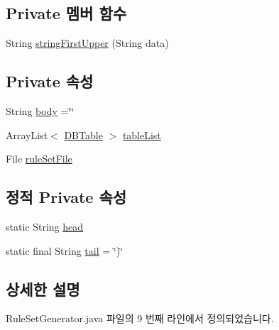 \subsection*{Private 멤버 함수}
\begin{DoxyCompactItemize}
\item 
String \mbox{\hyperlink{classcom_1_1github_1_1aites_1_1framework_1_1ruleset_1_1_rule_set_generator_a03d399d47d0d6aa6ffbb7c3ce7523fee}{string\+First\+Upper}} (String data)
\end{DoxyCompactItemize}
\subsection*{Private 속성}
\begin{DoxyCompactItemize}
\item 
String \mbox{\hyperlink{classcom_1_1github_1_1aites_1_1framework_1_1ruleset_1_1_rule_set_generator_a1fbfa36b17c118b50f731278af7d8ae5}{body}} =\char`\"{}\char`\"{}
\item 
Array\+List$<$ \mbox{\hyperlink{classcom_1_1github_1_1aites_1_1framework_1_1dbcomponent_1_1_d_b_table}{D\+B\+Table}} $>$ \mbox{\hyperlink{classcom_1_1github_1_1aites_1_1framework_1_1ruleset_1_1_rule_set_generator_ac7d8dddafc874c8c1d0bdedfec634d6d}{table\+List}}
\item 
File \mbox{\hyperlink{classcom_1_1github_1_1aites_1_1framework_1_1ruleset_1_1_rule_set_generator_a4a4bf29943c7c05a7e1a7d60040305ff}{rule\+Set\+File}}
\end{DoxyCompactItemize}
\subsection*{정적 Private 속성}
\begin{DoxyCompactItemize}
\item 
static String \mbox{\hyperlink{classcom_1_1github_1_1aites_1_1framework_1_1ruleset_1_1_rule_set_generator_a571e3c391cc48fdfdd9cc286988317fe}{head}}
\item 
static final String \mbox{\hyperlink{classcom_1_1github_1_1aites_1_1framework_1_1ruleset_1_1_rule_set_generator_a2bd41e50cccfad575989d06ea487100e}{tail}} = \char`\"{})\char`\"{}
\end{DoxyCompactItemize}


\subsection{상세한 설명}


Rule\+Set\+Generator.\+java 파일의 9 번째 라인에서 정의되었습니다.



